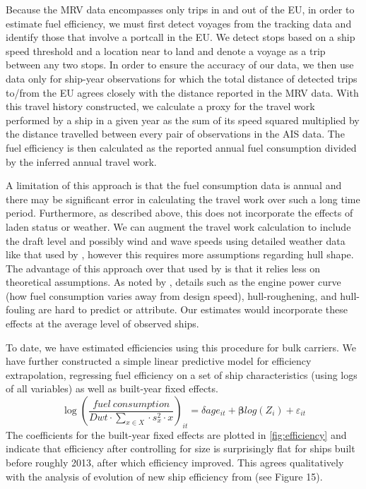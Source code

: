 \documentclass[hidelinks, 12pt,letterpaper]{article}
\begin{document}
Because the MRV data encompasses only trips in and out of the EU, in order to estimate fuel efficiency, we must first detect voyages from the tracking data and identify those that involve a portcall in the EU. We detect stops based on a ship speed threshold and a location near to land and denote a voyage as a trip between any two stops. In order to ensure the accuracy of our data, we then use data only for ship-year observations for which the total distance of detected trips to/from the EU agrees closely with the distance reported in the MRV data. With this travel history constructed, we calculate a proxy for the travel work performed by a ship in a given year as the sum of its speed squared multiplied by the distance travelled between every pair of observations in the AIS data. The fuel efficiency is then calculated as the reported annual fuel consumption divided by the inferred annual travel work.

A limitation of this approach is that the fuel consumption data is annual and there may be significant error in calculating the travel work over such a long time period. Furthermore, as described above, this does not incorporate the effects of laden status or weather. We can augment the travel work calculation to include the draft level and possibly wind and wave speeds using detailed weather data like that used by \citet{brancaccio2020geography}, however this requires more assumptions regarding hull shape. The advantage of this approach over that used by \citet{faber2020fourth} is that it relies less on theoretical assumptions. As noted by \citet{olmer2017greenhouse}, details such as the engine power curve (how fuel consumption varies away from design speed), hull-roughening, and hull-fouling are hard to predict or attribute. Our estimates would incorporate these effects at the average level of observed ships.

To date, we have estimated efficiencies using this procedure for bulk carriers. We have further constructed a simple linear predictive model for efficiency extrapolation, regressing fuel efficiency on a set of ship characteristics (using logs of all variables) as well as built-year fixed effects.
 \begin{equation}
 \log\left(
     \frac{fuel~consumption}{Dwt \cdot \sum_{x \in X}  \cdot s_x^2 \cdot x}
 \right)_{it}
         = \delta age_{it} + \boldsymbol{\beta}log(Z_i) + \varepsilon_{it}
 \end{equation}
The coefficients for the built-year fixed effects are plotted in \autoref{fig:efficiency} and indicate that efficiency after controlling for size is surprisingly flat for ships built before roughly 2013, after which efficiency improved. This agrees qualitatively with the analysis of evolution of new ship efficiency from \citet{faber2015historical} (see Figure 15).
\end{document}

